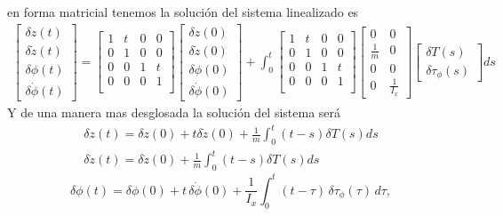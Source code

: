 \documentclass{uofa-eng-assignment}
\begin{document}
en forma matricial tenemos la solución del sistema linealizado es
\begin{align*}
    \begin{bmatrix}
    \delta z(t) \\
    \delta \dot{z}(t) \\
    \delta \phi(t) \\
    \delta \dot{\phi}(t)
    \end{bmatrix}= \begin{bmatrix}
                1 & t & 0 & 0 \\
        0 & 1 & 0 & 0 \\
        0 & 0 & 1 & t \\
        0 & 0 & 0 & 1 \\
    \end{bmatrix} \begin{bmatrix}
        \delta z(0) \\
        \delta \dot{z}(0) \\
        \delta \phi(0) \\
        \delta \dot{\phi}(0)
    \end{bmatrix} + \int_0^t \begin{bmatrix}
        1 & t & 0 & 0 \\
        0 & 1 & 0 & 0 \\
        0 & 0 & 1 & t \\
        0 & 0 & 0 & 1 \\
    \end{bmatrix} \begin{bmatrix}
        0 & 0 \\
        \frac{1}{m} & 0 \\
        0 & 0 \\
        0 & \frac{1}{I_x}
    \end{bmatrix} \begin{bmatrix}
        \delta T(s) \\
        \delta \tau_\phi(s)
    \end{bmatrix} ds
\end{align*}
Y de una manera mas desglosada la solución del sistema será
\begin{align*}
    \delta z(t) = \delta z(0)+ t \delta \dot{z}(0)+ \frac{1}{m}\int_0^t (t-s)\delta T(s) ds \\
    \delta \dot{z}(t) = \delta \dot{z}(0) + \frac{1}{m}\int_0^t (t-s)\delta T(s) ds 
\end{align*}
\[
\delta \phi(t)
=
\delta \phi(0)
+
t\,\delta \dot{\phi}(0)
+
\frac{1}{I_x}
\int_{0}^{t}
(t-\tau)\,\delta \tau_{\phi}(\tau)\, d\tau,
\]
\end{document}
